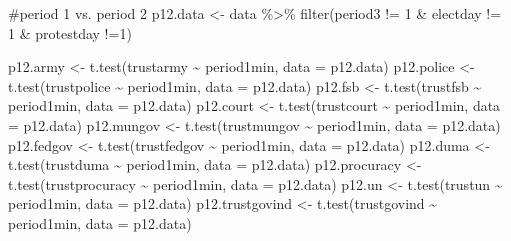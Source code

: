 \documentclass[
  letterpaper,
  DIV=11,
  numbers=noendperiod]{scrartcl}
\newenvironment{Shaded}{\begin{snugshade}}{\end{snugshade}}
\newcommand{\AttributeTok}[1]{\textcolor[rgb]{0.40,0.45,0.13}{#1}}
\newcommand{\CommentTok}[1]{\textcolor[rgb]{0.37,0.37,0.37}{#1}}
\newcommand{\DecValTok}[1]{\textcolor[rgb]{0.68,0.00,0.00}{#1}}
\newcommand{\FunctionTok}[1]{\textcolor[rgb]{0.28,0.35,0.67}{#1}}
\newcommand{\NormalTok}[1]{\textcolor[rgb]{0.00,0.23,0.31}{#1}}
\newcommand{\OtherTok}[1]{\textcolor[rgb]{0.00,0.23,0.31}{#1}}
\newcommand{\SpecialCharTok}[1]{\textcolor[rgb]{0.37,0.37,0.37}{#1}}
\begin{document}
\begin{Shaded}
\begin{Highlighting}[]
\CommentTok{\#period 1 vs. period 2}
\NormalTok{p12.data }\OtherTok{\textless{}{-}}\NormalTok{ data }\SpecialCharTok{\%\textgreater{}\%} \FunctionTok{filter}\NormalTok{(period3 }\SpecialCharTok{!=} \DecValTok{1} \SpecialCharTok{\&}\NormalTok{ electday }\SpecialCharTok{!=} \DecValTok{1} \SpecialCharTok{\&}\NormalTok{ protestday }\SpecialCharTok{!=}\DecValTok{1}\NormalTok{)}

\NormalTok{p12.army }\OtherTok{\textless{}{-}} \FunctionTok{t.test}\NormalTok{(trustarmy }\SpecialCharTok{\textasciitilde{}}\NormalTok{ period1min, }\AttributeTok{data =}\NormalTok{ p12.data)}
\NormalTok{p12.police }\OtherTok{\textless{}{-}} \FunctionTok{t.test}\NormalTok{(trustpolice }\SpecialCharTok{\textasciitilde{}}\NormalTok{ period1min, }\AttributeTok{data =}\NormalTok{ p12.data)}
\NormalTok{p12.fsb }\OtherTok{\textless{}{-}} \FunctionTok{t.test}\NormalTok{(trustfsb }\SpecialCharTok{\textasciitilde{}}\NormalTok{ period1min, }\AttributeTok{data =}\NormalTok{ p12.data)}
\NormalTok{p12.court }\OtherTok{\textless{}{-}} \FunctionTok{t.test}\NormalTok{(trustcourt }\SpecialCharTok{\textasciitilde{}}\NormalTok{ period1min, }\AttributeTok{data =}\NormalTok{ p12.data)}
\NormalTok{p12.mungov }\OtherTok{\textless{}{-}} \FunctionTok{t.test}\NormalTok{(trustmungov }\SpecialCharTok{\textasciitilde{}}\NormalTok{ period1min, }\AttributeTok{data =}\NormalTok{ p12.data)}
\NormalTok{p12.fedgov }\OtherTok{\textless{}{-}} \FunctionTok{t.test}\NormalTok{(trustfedgov }\SpecialCharTok{\textasciitilde{}}\NormalTok{ period1min, }\AttributeTok{data =}\NormalTok{ p12.data)}
\NormalTok{p12.duma }\OtherTok{\textless{}{-}} \FunctionTok{t.test}\NormalTok{(trustduma }\SpecialCharTok{\textasciitilde{}}\NormalTok{ period1min, }\AttributeTok{data =}\NormalTok{ p12.data)}
\NormalTok{p12.procuracy }\OtherTok{\textless{}{-}} \FunctionTok{t.test}\NormalTok{(trustprocuracy }\SpecialCharTok{\textasciitilde{}}\NormalTok{ period1min, }\AttributeTok{data =}\NormalTok{ p12.data)}
\NormalTok{p12.un }\OtherTok{\textless{}{-}} \FunctionTok{t.test}\NormalTok{(trustun }\SpecialCharTok{\textasciitilde{}}\NormalTok{ period1min, }\AttributeTok{data =}\NormalTok{ p12.data)}
\NormalTok{p12.trustgovind }\OtherTok{\textless{}{-}} \FunctionTok{t.test}\NormalTok{(trustgovind }\SpecialCharTok{\textasciitilde{}}\NormalTok{ period1min, }\AttributeTok{data =}\NormalTok{ p12.data)}
\end{Highlighting}
\end{Shaded}
\end{document}
